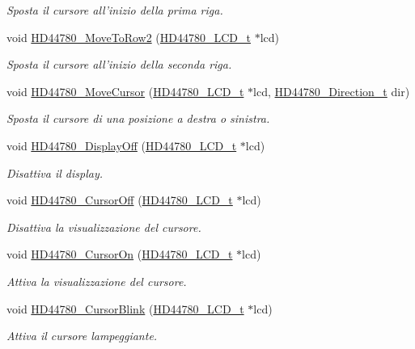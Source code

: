 \begin{DoxyCompactItemize}
\begin{DoxyCompactList}\small\item\em Sposta il cursore all'inizio della prima riga. \end{DoxyCompactList}\item 
void \hyperlink{group___h_d44780_ga713670d498b6f5d50a174df19081c515}{H\+D44780\+\_\+\+Move\+To\+Row2} (\hyperlink{struct_h_d44780___l_c_d__t}{H\+D44780\+\_\+\+L\+C\+D\+\_\+t} $\ast$lcd)
\begin{DoxyCompactList}\small\item\em Sposta il cursore all'inizio della seconda riga. \end{DoxyCompactList}\item 
void \hyperlink{group___h_d44780_gabcea9a03050c46530e39b7556c673baf}{H\+D44780\+\_\+\+Move\+Cursor} (\hyperlink{struct_h_d44780___l_c_d__t}{H\+D44780\+\_\+\+L\+C\+D\+\_\+t} $\ast$lcd, \hyperlink{group___h_d44780_gaf46f4db4f981d3a1088804a6d6980d30}{H\+D44780\+\_\+\+Direction\+\_\+t} dir)
\begin{DoxyCompactList}\small\item\em Sposta il cursore di una posizione a destra o sinistra. \end{DoxyCompactList}\item 
void \hyperlink{group___h_d44780_ga5cf07b2179272029410f9a81f56621ed}{H\+D44780\+\_\+\+Display\+Off} (\hyperlink{struct_h_d44780___l_c_d__t}{H\+D44780\+\_\+\+L\+C\+D\+\_\+t} $\ast$lcd)
\begin{DoxyCompactList}\small\item\em Disattiva il display. \end{DoxyCompactList}\item 
void \hyperlink{group___h_d44780_ga56421dc398825188aa10257063a3ee4b}{H\+D44780\+\_\+\+Cursor\+Off} (\hyperlink{struct_h_d44780___l_c_d__t}{H\+D44780\+\_\+\+L\+C\+D\+\_\+t} $\ast$lcd)
\begin{DoxyCompactList}\small\item\em Disattiva la visualizzazione del cursore. \end{DoxyCompactList}\item 
void \hyperlink{group___h_d44780_ga3a381cb44df5d76d79be5ed71a52bae6}{H\+D44780\+\_\+\+Cursor\+On} (\hyperlink{struct_h_d44780___l_c_d__t}{H\+D44780\+\_\+\+L\+C\+D\+\_\+t} $\ast$lcd)
\begin{DoxyCompactList}\small\item\em Attiva la visualizzazione del cursore. \end{DoxyCompactList}\item 
void \hyperlink{group___h_d44780_ga92eb58cb7d73c9a87b7087a9c56f73d5}{H\+D44780\+\_\+\+Cursor\+Blink} (\hyperlink{struct_h_d44780___l_c_d__t}{H\+D44780\+\_\+\+L\+C\+D\+\_\+t} $\ast$lcd)
\begin{DoxyCompactList}\small\item\em Attiva il cursore lampeggiante. \end{DoxyCompactList}\end{DoxyCompactItemize}


